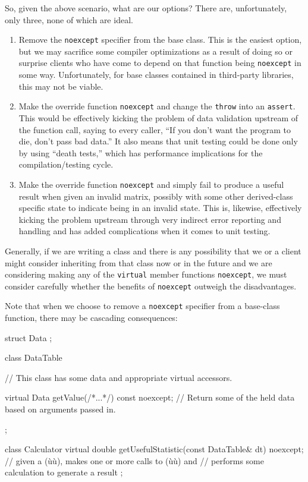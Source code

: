 So, given the above scenario, what are our options? There are,
unfortunately, only three, none of which are ideal.
\begin{enumerate}
\item{Remove the \lstinline!noexcept! specifier from the base class. This is the easiest option, but we may sacrifice some compiler optimizations as a result of doing so or surprise clients who have come to depend on that function being \lstinline!noexcept! in some way. Unfortunately, for base classes contained in third-party libraries, this may not be viable.}
\item{Make the override function \lstinline!noexcept! and change the \lstinline!throw! into an \lstinline!assert!. This would be effectively kicking the problem of data validation upstream of the function call, saying to every caller, ``If you don’t want the program to die, don’t pass bad data.'' It also means that unit testing could be done only by using ``death tests,'' which has performance implications for the compilation/testing cycle.}
\item{Make the override function \lstinline!noexcept! and simply fail to produce a useful result when given an invalid matrix, possibly with some other derived-class specific state to indicate being in an invalid state. This is, likewise, effectively kicking the problem upstream through very indirect error reporting and handling and has added complications when it comes to unit testing.}
\end{enumerate}
Generally, if we are writing a class and there is any possibility that
we or a client might consider inheriting from that class now or in the
future and we are considering making any of the \lstinline!virtual! member
functions \lstinline!noexcept!, we must consider carefully whether the
benefits of \lstinline!noexcept! outweigh the disadvantages.

Note that when we choose to remove a \lstinline!noexcept! specifier from a
base-class function, there may be cascading consequences:

\begin{emcppshiddenlisting}[emcppsbatch=e31]
struct Data {} ;
\end{emcppshiddenlisting}
\begin{emcppslisting}[emcppsbatch=e31]
class DataTable
{
    // This class has some data and appropriate virtual accessors.

    virtual Data getValue(/*...*/) const noexcept;
        // Return some of the held data based on arguments passed in.
};

class Calculator
{
    virtual double getUsefulStatistic(const DataTable& dt) noexcept;
        // given a (ù{}ù), makes one or more calls to (ù{}ù) and
        // performs some calculation to generate a result
};
\end{emcppslisting}
    

